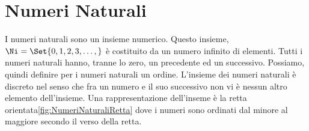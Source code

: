 \chapter{Numeri Naturali}
\label{cha:NumeriNaturali}
I numeri naturali   sono un insieme numerico.  Questo insieme, $\Ni=\Set{0,1,2,3,\dots,}$ è  costituito da un numero infinito di elementi. Tutti i numeri naturali hanno, tranne lo zero, un precedente ed un successivo. Possiamo, quindi definire per i numeri naturali un ordine.  L'insieme dei numeri naturali è discreto nel senso che fra un numero e il suo successivo non vi è nessun altro elemento dell'insieme. Una rappresentazione dell'inseme  è la retta orientata\nobs\vref{fig:NumeriNaturaliRetta} dove i numeri sono ordinati dal minore al maggiore secondo il verso della retta. 
